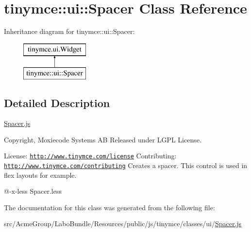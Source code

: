 \hypertarget{classtinymce_1_1ui_1_1_spacer}{\section{tinymce\+:\+:ui\+:\+:Spacer Class Reference}
\label{classtinymce_1_1ui_1_1_spacer}
}
Inheritance diagram for tinymce\+:\+:ui\+:\+:Spacer\+:\begin{figure}[H]
\begin{center}
\leavevmode
\includegraphics[height=2.000000cm]{classtinymce_1_1ui_1_1_spacer}
\end{center}
\end{figure}


\subsection{Detailed Description}
\hyperlink{_spacer_8js}{Spacer.\+js}

Copyright, Moxiecode Systems A\+B Released under L\+G\+P\+L License.

License\+: \href{http://www.tinymce.com/license}{\tt http\+://www.\+tinymce.\+com/license} Contributing\+: \href{http://www.tinymce.com/contributing}{\tt http\+://www.\+tinymce.\+com/contributing} Creates a spacer. This control is used in flex layouts for example.

@-\/x-\/less Spacer.\+less 

The documentation for this class was generated from the following file\+:\begin{DoxyCompactItemize}
\item 
src/\+Acme\+Group/\+Labo\+Bundle/\+Resources/public/js/tinymce/classes/ui/\hyperlink{_spacer_8js}{Spacer.\+js}\end{DoxyCompactItemize}
